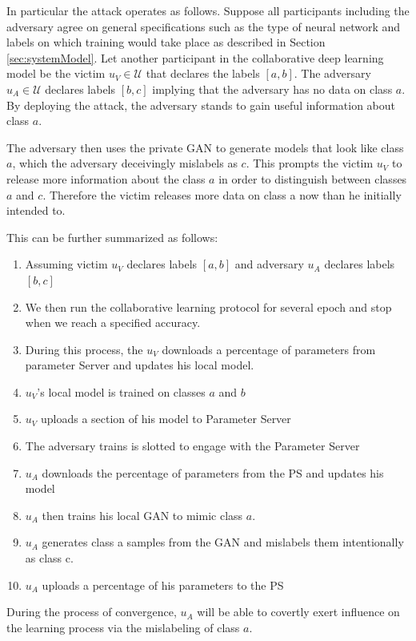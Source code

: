 \documentclass[conference]{IEEEtran}
\begin{document}


In particular the attack operates as follows. Suppose all participants including the adversary agree on general specifications such as
the type of neural network and labels on which training would take place as described in Section \ref{sec:systemModel}. Let another
participant in the collaborative deep learning
model be the victim $u_V\in\mathcal{U}$ that declares the labels $[a,b]$. The adversary $u_A\in\mathcal{U}$ declares labels $[b,c]$ implying that the
adversary has no data on class $a$. By deploying the attack, the adversary stands to gain useful information about class $a$.

The adversary then uses the private GAN to generate models that look like class $a$, which the adversary deceivingly mislabels as $c$.
This prompts the victim  $u_V$ to release more information about the class $a$ in order to distinguish between classes 
$a$ and $c$. Therefore the victim releases more data on class a now than he initially intended to.

This can be further summarized as follows:
\begin {enumerate}
\item Assuming victim $u_V$ declares labels $[a,b]$ and adversary $u_A$ declares labels $[b,c]$
\item We then run the collaborative learning protocol for several epoch and stop when we reach a specified accuracy.
\item During this process, the $u_V$ downloads a percentage of parameters from parameter Server and updates his local model.
\item $u_V$'s local model is trained on classes $a$ and $b$
\item $u_V$ uploads a section of his model to Parameter Server
\item The adversary trains is slotted to engage with the Parameter Server
\item $u_A$ downloads the percentage of parameters from the PS and updates his model
\item $u_A$ then trains his local GAN to mimic class $a$.
\item $u_A$ generates class a samples from the GAN and mislabels them intentionally as class c.
\item $u_A$ uploads a percentage of his parameters to the PS
\end {enumerate}
During the process of convergence, $u_A$ will be able to covertly exert influence on the learning process via the mislabeling of class
$a$.
\end{document}
